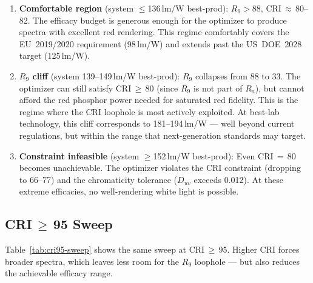 \documentclass[11pt]{article}
\begin{document}
\begin{enumerate}
\item \textbf{Comfortable region} (system $\leq$136\,lm/W best-prod):
  $R_9 > 88$, CRI\,$\approx$\,80--82.  The efficacy budget is generous
  enough for the optimizer to produce spectra with excellent red rendering.
  This regime comfortably covers the EU~2019/2020 requirement (98\,lm/W)
  and extends past the US~DOE~2028 target (125\,lm/W).

\item \textbf{$R_9$ cliff} (system 139--149\,lm/W best-prod):
  $R_9$ collapses from 88 to 33.  The optimizer can still satisfy
  CRI\,$\geq$\,80 (since $R_9$ is not part of $R_a$), but cannot
  afford the red phosphor power needed for saturated red fidelity.
  This is the regime where the CRI loophole is most actively exploited.
  At best-lab technology, this cliff corresponds to 181--194\,lm/W ---
  well beyond current regulations, but within the range that
  next-generation standards may target.

\item \textbf{Constraint infeasible} (system $\geq$152\,lm/W best-prod):
  Even CRI\,$=$\,80 becomes unachievable.  The optimizer violates the
  CRI constraint (dropping to 66--77) and the chromaticity tolerance
  ($D_{uv}$ exceeds 0.012).  At these extreme efficacies, no
  well-rendering white light is possible.
\end{enumerate}

\subsection{CRI\,$\geq$\,95 Sweep}

Table~\ref{tab:cri95-sweep} shows the same sweep at CRI\,$\geq$\,95.
Higher CRI forces broader spectra, which leaves less room for the
$R_9$ loophole --- but also reduces the achievable efficacy range.
\end{document}

